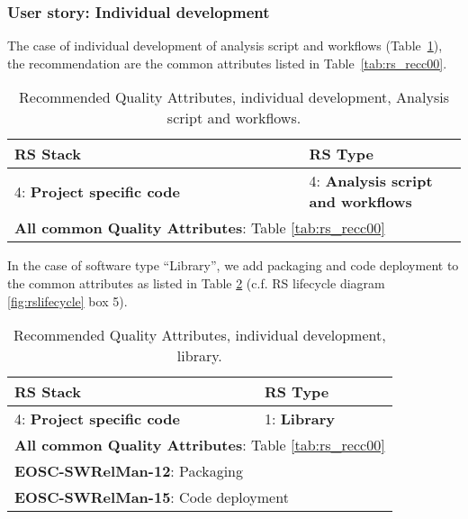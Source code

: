 \subsubsection{User story: Individual development}

The case of individual development of analysis script and workflows (Table~\ref{tab:rs_recc01}), the recommendation are the common attributes listed in Table~\ref{tab:rs_recc00}.

\begin{center}
\begin{table}[h]
  \small
  \begin{tabular}{|p{0.65\linewidth}|p{0.35\linewidth}|} \hline

    \textbf{RS Stack} & \textbf{RS Type} \\ \hline \hline
    4: \textbf{Project specific code} &
    4: \textbf{Analysis script and workflows} \\ \hline \hline
    \multicolumn{2}{|l|}{\textbf{All common Quality Attributes}: Table \ref{tab:rs_recc00}} \\ \hline

  \end{tabular}
  \caption{Recommended Quality Attributes, individual development, Analysis script and workflows.}
  \label{tab:rs_recc01}
\end{table}
\end{center}

In the case of software type ``Library'', we add packaging and code deployment to the common attributes as listed in Table \ref{tab:rs_recc02} (c.f. RS lifecycle diagram \ref{fig:rslifecycle} box 5).

\begin{center}
\begin{table}
  \small
  \begin{tabular}{|p{0.65\linewidth}|p{0.35\linewidth}|} \hline

    \textbf{RS Stack} & \textbf{RS Type} \\ \hline \hline
    4: \textbf{Project specific code} &
    1: \textbf{Library} \\ \hline \hline
    \multicolumn{2}{|l|}{\textbf{All common Quality Attributes}: Table \ref{tab:rs_recc00}} \\ \hline
    \multicolumn{2}{|l|}{\textbf{EOSC-SWRelMan-12}: Packaging} \\ \hline
    \multicolumn{2}{|l|}{\textbf{EOSC-SWRelMan-15}: Code deployment} \\ \hline

  \end{tabular}
  \caption{Recommended Quality Attributes, individual development, library.}
  \label{tab:rs_recc02}
\end{table}
\end{center}


